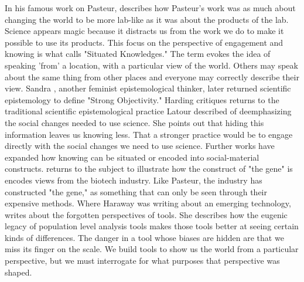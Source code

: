 \documentclass[a4paper,man,natbib]{apa6}
\makeatletter
\renewcommand{\epigraphsize}{\small}
\renewcommand{\textflush}{flushright}
\renewcommand{\sourceflush}{flushright}
\newcommand{\epitextfont}{\itshape}
\newcommand{\episourcefont}{\scshape}
\newlength\epi@finalwidth
\renewcommand{\epigraph}[2]{%
  \vspace{\beforeepigraphskip}
  {\epigraphsize\begin{\epigraphflush}
   \epi@finalwidth=\z@
   \sbox\epi@textbox{%
     \varwidth{\epigraphwidth}
     \begin{\textflush}\epitextfont#1\end{\textflush}
     \endvarwidth
   }%
   \epi@finalwidth=\wd\epi@textbox
   \sbox\epi@sourcebox{%
     \varwidth{\epigraphwidth}
     \begin{\sourceflush}\episourcefont#2\end{\sourceflush}%
     \endvarwidth
   }%
   \ifdim\wd\epi@sourcebox>\epi@finalwidth 
     \epi@finalwidth=\wd\epi@sourcebox
   \fi
   \leavevmode\vbox{
     \hb@xt@\epi@finalwidth{\hfil\box\epi@textbox}
     \vskip1.75ex
     \hrule height \epigraphrule
     \vskip.75ex
     \hb@xt@\epi@finalwidth{\hfil\box\epi@sourcebox}
   }%
   \end{\epigraphflush}
   \vspace{\afterepigraphskip}}}
\makeatother
\begin{document}
   In his famous work on Pasteur, \citet{Latour1983-bs} describes how Pasteur's work was as much about changing the world to be more lab-like as it was about the products of the lab. Science appears magic because it distracts us from the work we do to make it possible to use its products. This focus on the perspective of engagement and knowing is what \citet{Haraway1988-nh} calls "Situated Knowledges." The term evokes the idea of speaking 'from' a location, with a particular view of the world. Others may speak about the same thing from other places and everyone may correctly describe their view. Sandra \citet{Harding1992-od}, another feminist epistemological thinker, later returned scientific epistemology to define "Strong Objectivity." Harding critiques returns to the traditional scientific epistemological practice Latour described of deemphasizing the social changes needed to use science. She points out that hiding this information leaves us knowing less. That a stronger practice would be to engage directly with the social changes we need to use science.
   \medskip
   Further works have expanded how knowing can be situated or encoded into social-material constructs. \citet{Harraway1997-va} returns to the subject to illustrate how the construct of "the gene" is encodes views from the biotech industry. Like Pasteur, the industry has constructed "the gene," as something that can only be seen through their expensive methods. Where Haraway was writing about an emerging technology, \citet{Subramaniam2014-wg} writes about the forgotten perspectives of tools. She describes how the eugenic legacy of population level analysis tools makes those tools better at seeing certain kinds of differences. The danger in a tool whose biases are hidden are that we miss its finger on the scale. We build tools to show us the world from a particular perspective, but we must interrogate for what purposes that perspective was shaped.
   \bigskip

\end{document}

